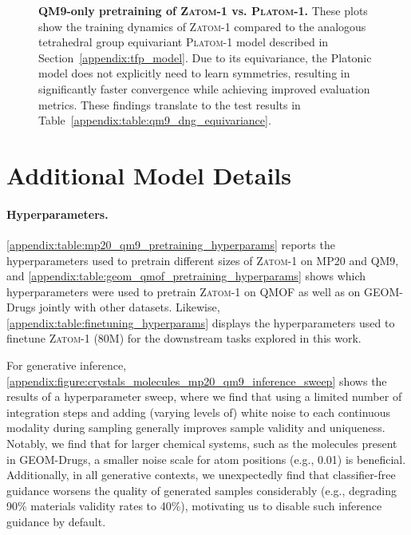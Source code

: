 \documentclass{article}
\theoremstyle{plain}
\theoremstyle{definition}
\theoremstyle{remark}
\begin{document}
\begin{figure}[!h]
    \vspace*{2ex}
    \caption{
        \textbf{QM9-only pretraining of \textsc{Zatom-1} vs. \textsc{Platom-1}.}
        These plots show the training dynamics of \textsc{Zatom-1} compared to the analogous tetrahedral group equivariant \textsc{Platom-1} model described in Section~\ref{appendix:tfp_model}.
        Due to its equivariance, the Platonic model does not explicitly need to learn symmetries, resulting in significantly faster convergence while achieving improved evaluation metrics.
        These findings translate to the test results in Table~\ref{appendix:table:qm9_dng_equivariance}.
    }
    \label{appendix:figure:tfp_qm9_equivariance_experiment}
\end{figure}

\clearpage

\section{Additional Model Details}
\label{appendix:additional_model_details}

\paragraph{Hyperparameters.} \cref{appendix:table:mp20_qm9_pretraining_hyperparams} reports the hyperparameters used to pretrain different sizes of \textsc{Zatom-1} on MP20 and QM9, and \cref{appendix:table:geom_qmof_pretraining_hyperparams} shows which hyperparameters were used to pretrain \textsc{Zatom-1} on QMOF as well as on GEOM-Drugs jointly with other datasets. Likewise, \cref{appendix:table:finetuning_hyperparams} displays the hyperparameters used to finetune \textsc{Zatom-1} (80M) for the downstream tasks explored in this work.

For generative inference, \cref{appendix:figure:crystals_molecules_mp20_qm9_inference_sweep} shows the results of a hyperparameter sweep, where we find that using a limited number of integration steps and adding (varying levels of) white noise to each continuous modality during sampling generally improves sample validity and uniqueness. Notably, we find that for larger chemical systems, such as the molecules present in GEOM-Drugs, a smaller noise scale for atom positions (e.g., 0.01) is beneficial. Additionally, in all generative contexts, we unexpectedly find that classifier-free guidance worsens the quality of generated samples considerably (e.g., degrading 90\% materials validity rates to 40\%), motivating us to disable such inference guidance by default.
\end{document}
